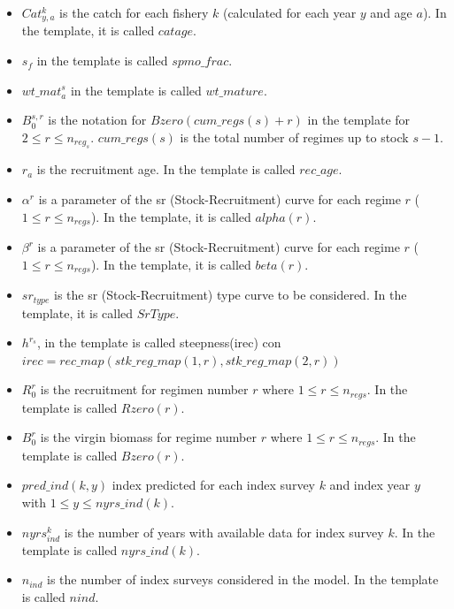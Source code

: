 \documentclass{article}
\begin{document}
\begin{itemize}
    \item $Cat^k_{y,a}$ is the catch for each fishery $k$ (calculated for each year $y$ and age $a$). In the template, it is called $catage$.
    \item $s_f$ in the template is called  $spmo\_frac$.
    \item ${wt\_{mat}}^s_a$ in the template is called 
    $wt\_mature$.
    \item $B^{s,r}_0$ is the notation for $Bzero(cum\_regs(s)+r)$ in the template  for $2\leq r \leq n_{reg_s}$. $cum\_regs(s)$ is the total number of regimes up to stock $s-1$.
    \item $r_a$ is the recruitment age. In the template is called $rec\_age$.
    \item $\alpha^r$ is a parameter of the sr (Stock-Recruitment) curve for each regime $r$ ($1\leq r \leq n_{regs}$).  
 In the template, it is called $alpha(r)$.
    \item $\beta^r$  is a parameter of the sr (Stock-Recruitment) curve for each regime $r$ ($1\leq r \leq n_{regs}$).  
 In the template, it is called 
 $beta(r)$. 
    \item $ sr_{type}$ is the sr (Stock-Recruitment) type curve to be considered. In the template, it is called $SrType$.
    \item $h^{r_s}$, in the template is called steepness(irec) con $irec=rec\_map(stk\_reg\_map(1,r),stk\_reg\_map(2,r))$
    \item $R^{r}_0$ is the recruitment for regimen number $r$ where $1\leq r \leq n_{regs}$. In the template is called $Rzero(r)$.
    \item $B^{r}_0$ is the virgin biomass for regime number $r$ where $1\leq r \leq n_{regs}$. In the template is called $Bzero(r)$.
    \item $pred\_ind(k,y)$ index predicted for each index survey $k$ and index year $y$ with $1\leq y \leq nyrs\_ind(k)$.
    \item $nyrs_{ind}^k$ is the number of years with available data for index survey $k$. In the template is called $nyrs\_ind(k)$.
    \item $n_{ind}$ is the number of index surveys considered in the model. In the template is called $nind$.

\end{itemize}
\end{document}
